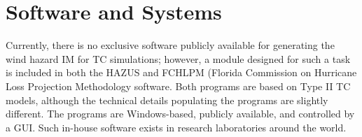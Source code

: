 \section{Software and Systems}
\label{sec:storm_wind_tools}

Currently, there is no exclusive software publicly available for generating the wind hazard IM for TC simulations; however, a module designed for such a task is included in both the HAZUS \citep{vickery2006hazusmh} and FCHLPM (Florida Commission on Hurricane Loss Projection Methodology \citep{hamid2010predicting, powell2005state} software. Both programs are based on Type II TC models, although the technical details populating the programs are slightly different. The programs are Windows-based, publicly available, and controlled by a GUI. Such in-house software exists in research laboratories around the world.